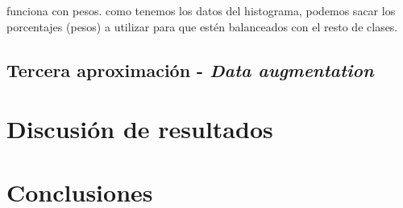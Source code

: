 \documentclass[]{scrartcl}
\begin{document}
	funciona con pesos. como tenemos los datos del histograma, podemos sacar los porcentajes (pesos) a utilizar para que estén balanceados con el resto de clases.
	
	\subsection{Tercera aproximación - \textit{Data augmentation}}
	
\section{Discusión de resultados}

\section{Conclusiones}



\end{document}
